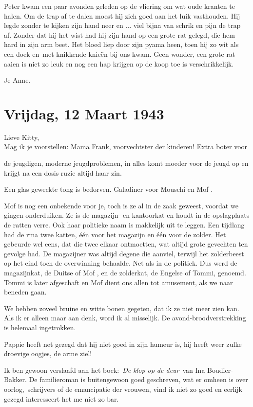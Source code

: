 \documentclass{book}
\begin{document}
Peter kwam een paar avonden geleden op de vliering om wat oude kranten
te halen. Om de trap af te dalen moest hij zich goed aan het luik
vasthouden. Hij legde zonder te kijken zijn hand neer en ... viel bijna
van schrik en pijn de trap af. Zonder dat hij het wist had hij zijn hand
op een grote rat gelegd, die hem hard in zijn arm beet. Het bloed liep
door zijn pyama heen, toen hij zo wit als een doek en~met knikkende
knieën bij ons kwam. Geen wonder, een grote rat aaien is niet zo leuk en
nog een hap krijgen op de koop toe is verschrikkelijk.

Je Anne.

\chapter{Vrijdag, 12 Maart 1943}

Lieve Kitty,\\Mag ik je voorstellen: Mama Frank, voorvechtster der
kinderen! Extra boter voor

de jeugdigen, moderne jeugdproblemen, in alles komt moeder voor de jeugd
op en krijgt na een dosis ruzie altijd haar zin.

Een glas geweckte tong is bedorven. Galadiner voor Mouschi en Mof .

Mof is nog een onbekende voor je, toch is ze al in de zaak geweest,
voordat we gingen onderduiken. Ze is de magazijn- en kantoorkat en houdt
in de opslagplaats de ratten verre. Ook haar politieke naam is makkelijk
uit te leggen. Een tijdlang had de rma twee katten, één voor het
magazijn en één voor de zolder. Het gebeurde wel eens, dat die twee
elkaar ontmoetten, wat altijd grote gevechten ten gevolge had. De
magazijner was altijd degene die aanviel, terwijl het zolderbeest op het
eind toch de overwinning behaalde. Net als in de politiek. Dus werd de
magazijnkat, de Duitse of Mof , en de zolderkat, de Engelse of Tommi,
genoemd. Tommi is later afgeschaft en Mof dient ons allen tot amusement,
als we naar beneden gaan.

We hebben zoveel bruine en witte bonen gegeten, dat ik ze niet meer zien
kan. Als ik er alleen maar aan denk, word ik al misselijk. De
avond-broodverstrekking is helemaal ingetrokken.

Pappie heeft net gezegd dat hij niet goed in zijn humeur is, hij heeft
weer zulke droevige oogjes, de arme ziel!

Ik ben gewoon verslaafd aan het boek:~\emph{De klop op de deur}~van Ina
Boudier-Bakker. De familieroman is buitengewoon goed geschreven, wat er
omheen is over oorlog,~schrijvers of de emancipatie der vrouwen, vind ik
niet zo goed en eerlijk gezegd interesseert het me niet zo bar.
\end{document}
